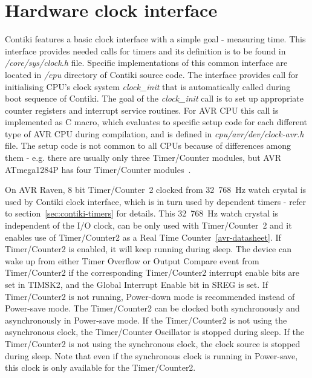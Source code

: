 
\section{Hardware clock interface}
Contiki features a basic clock interface with a simple goal - measuring time.
This interface provides needed calls for timers and its definition is to be found in {\it{/core/sys/clock.h}} file.
Specific implementations of this common interface are located in {\it{/cpu}} directory of Contiki source code.
The interface provides call for initialising CPU's clock system {\it{clock\_init}} that is automatically called during
boot sequence of Contiki.
The goal of the {\it{clock\_init}} call is to set up
appropriate counter registers and interrupt service routines. %
For AVR CPU this call is implemented as C macro, which evaluates to specific setup code for each
different type of AVR CPU during compilation, and is defined in {\it{cpu/avr/dev/clock-avr.h}} file.
The setup code is not common to all CPUs because of differences among them - e.g. there are usually
only three Timer/Counter modules, but AVR ATmega1284P has four Timer/Counter modules~\cite{avr-datasheet}.

On AVR Raven, 8 bit Timer/Counter~2 clocked from 32~768~Hz watch crystal
is used by Contiki clock interface,
which is in turn used by dependent timers - refer to section~\ref{sec:contiki-timers} for details.
This 32~768~Hz watch crystal is independent of the I/O clock, can be only used
with Timer/Counter~2 and it
enables use of Timer/Counter2 as a Real Time Counter~\ref{avr-datasheet}.
If Timer/Counter2 is enabled, it will keep running during sleep. The device can wake up from
either Timer Overflow or Output Compare event from Timer/Counter2 if the corresponding
Timer/Counter2 interrupt enable bits are set in TIMSK2, and the Global Interrupt Enable bit in
SREG is set.
If Timer/Counter2 is not running, Power-down mode is recommended instead of Power-save
mode.
The Timer/Counter2 can be clocked both synchronously and asynchronously in Power-save
mode. If the Timer/Counter2 is not using the asynchronous clock, the Timer/Counter Oscillator is
stopped during sleep. If the Timer/Counter2 is not using the synchronous clock, the clock source
is stopped during sleep. Note that even if the synchronous clock is running in Power-save, this
clock is only available for the Timer/Counter2.



